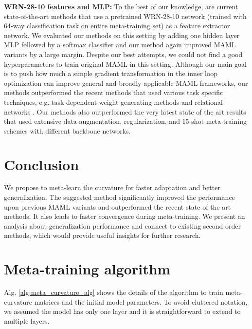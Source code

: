 \documentclass{article}
\begin{document}
\textbf{WRN-28-10 features and MLP:} To the best of our knowledge, \cite{rusu-iclr19, Qiao-cvpr18} are current state-of-the-art methods that use a pretrained WRN-28-10 \cite{wrn} network (trained with 64-way classification task on entire meta-training set) as a feature extractor network. We evaluated our methods on this setting by adding one hidden layer MLP followed by a softmax classifier and our method again improved MAML variants by a large margin. Despite our best attempts, we could not find a good hyperparameters to train original MAML in this setting. 
Although our main goal is to push how much a simple gradient transformation in the inner loop optimization can improve general and broadly applicable MAML frameworks, our methods outperformed the recent methods that used various task specific techniques, e.g. task dependent weight generating methods \cite{rusu-iclr19, Qiao-cvpr18} and relational networks \cite{rusu-iclr19}. Our methods also outperformed the very latest state of the art results \cite{metaopt} that used extensive data-augmentation, regularization, and 15-shot meta-training schemes with different backbone networks.







\section{Conclusion}
\label{conclusion}
We propose to meta-learn the curvature for faster adaptation and better generalization. The suggested method significantly improved the performance upon previous MAML variants and outperformed the recent state of the art methods. It also leads to faster convergence during meta-training. We present an analysis about generalization performance and connect to existing second order methods, which would provide useful insights for further research.
















\clearpage
\appendix

\section{Meta-training algorithm}
Alg. \ref{alg:meta_curvature_alg} shows the details of the algorithm to train meta-curvature matrices and the initial model parameters. To avoid cluttered notation, we assumed the model has only one layer and it is straightforward to extend to multiple layers.
\end{document}
